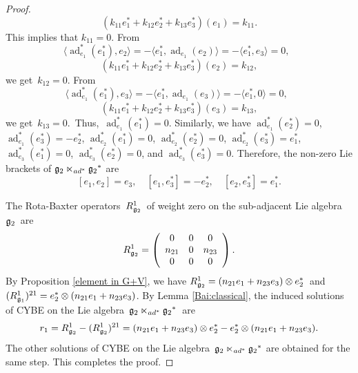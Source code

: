 \documentclass[12pt, reqno]{amsart}
\theoremstyle{plain}
\DeclareMathOperator \ad { {\mathrm{ad}} }
\begin{document}
\begin{proof}
\begin{equation*}
\end{equation*}
\begin{equation*}
(k_{11}e^{\ast}_{1}+k_{12}e^{\ast}_{2}+k_{13}e^{\ast}_{3})({e_1})=k_{11}.
\end{equation*}
This implies that $k_{11}=0$. From
\begin{equation*}
\langle \ad_{e_1}^*(e^{\ast}_{1}),{e_2} \rangle=-\langle e^{\ast}_{1}, \ad_{e_1}(e_{2})\rangle=-\langle e^{\ast}_{1}, {e_3}\rangle=0, \;\;
\end{equation*}
\begin{equation*}
(k_{11}e^{\ast}_{1}+k_{12}e^{\ast}_{2}+k_{13}e^{\ast}_{3})({e_2})=k_{12},
\end{equation*}
we get~$k_{12}=0$. From
\begin{equation*}
\langle \ad_{e_1}^*(e^{\ast}_{1}),{e_3} \rangle=-\langle e^{\ast}_{1}, \ad_{e_1}(e_{3})\rangle=-\langle e^{\ast}_{1}, 0\rangle=0, \;\;
\end{equation*}
\begin{equation*}
(k_{11}e^{\ast}_{1}+k_{12}e^{\ast}_{2}+k_{13}e^{\ast}_{3})({e_3})=k_{13},
\end{equation*}
we get~$k_{13}=0$.~Thus,~$\ad_{e_1}^*(e^{\ast}_{1})
=0$.
Similarly, we have $\ad_{e_1}^*(e^{\ast}_{2})=0$, $\ad_{e_1}^*(e^{\ast}_{3})=-e^{\ast}_{2}$, $\ad_{e_2}^*(e^{\ast}_{1})=0$, $\ad_{e_2}^*(e^{\ast}_{2})=0$, $\ad_{e_2}^*(e^{\ast}_{3})=e^{\ast}_{1}$, $\ad_{e_3}^*(e^{\ast}_{1})=0$, $\ad_{e_3}^*(e^{\ast}_{2})=0$, and $\ad_{e_3}^*(e^{\ast}_{3})=0$.
Therefore, the non-zero Lie brackets of ${\frak g_2} \ltimes_{{\rm ad}^{\ast}} {\frak g_2}^{\ast}$ are
$$
[e_1,e_2]=e_3,\quad [e_1,e^{\ast}_{3}]=-e^{\ast}_{2},\quad [e_2,e^{\ast}_{3}]=e^{\ast}_{1}.
$$  



The Rota-Baxter operators~$R_{\frak g_2}^1$~of weight zero on the sub-adjacent Lie algebra~${\frak g_2}$~are
\begin{equation*}
R_{\frak g_2}^1=
\left(\begin{array}{ccc}0 & 0 &0\\
  n_{21} & 0&n_{23}\\
  0& 0& 0 \\
\end{array}\right).
\end{equation*}
By Proposition \ref{element in G+V}, we have $R_{\frak g_2}^1=(n_{21}e_1+n_{23}e_3) \otimes e_2^{\ast}$~and~$(R_{\frak g_1}^1)^{21}=e_2^{\ast} \otimes (n_{21}e_1+n_{23}e_3)$.
By Lemma \ref{Bai:classical}, the induced solutions of CYBE on the Lie algebra~${\frak g_2} \ltimes_{{\rm ad}^{\ast}} {\frak g_2}^{\ast}$~are
$$r_1 =R_{\frak g_2}^1-(R_{\frak g_2}^1)^{21}= (n_{21}e_1+n_{23}e_3) \otimes e_2^{\ast} - e_2^{\ast} \otimes (n_{21}e_1+n_{23}e_3).$$
The other solutions of CYBE on the Lie algebra~${\frak g_2} \ltimes_{{\rm ad}^{\ast}} {\frak g_2}^{\ast}$ are obtained for the same step. This completes the proof.
\end{proof}
\end{document}
